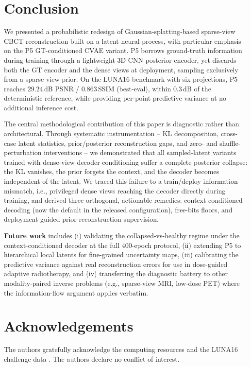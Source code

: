 
\section{Conclusion}
\label{sec:conclusion}

We presented a probabilistic redesign of Gaussian-splatting-based
sparse-view CBCT reconstruction built on a latent neural process, with
particular emphasis on the P5 GT-conditioned CVAE variant. P5 borrows
ground-truth information during training through a lightweight 3D CNN
posterior encoder, yet discards both the GT encoder and the dense views
at deployment, sampling exclusively from a sparse-view prior. On the
LUNA16 benchmark with six projections, P5 reaches $29.24$\,dB PSNR /
$0.863$\,SSIM (best-eval), within $0.3$\,dB of the deterministic
reference, while providing per-point predictive variance at no
additional inference cost.

The central methodological contribution of this paper is diagnostic
rather than architectural. Through systematic instrumentation -- KL
decomposition, cross-case latent statistics, prior/posterior
reconstruction gaps, and zero- and shuffle-perturbation interventions --
we demonstrated that all sampled-latent variants trained with
dense-view decoder conditioning suffer a complete posterior collapse:
the KL vanishes, the prior forgets the context, and the decoder becomes
independent of the latent. We traced this failure to a train/deploy
information mismatch, i.e., privileged dense views reaching the decoder
directly during training, and derived three orthogonal, actionable
remedies: context-conditioned decoding (now the default in the released
configuration), free-bits floors, and deployment-guided
prior-reconstruction supervision.

\textbf{Future work} includes (i) validating the collapsed-vs-healthy
regime under the context-conditioned decoder at the full 400-epoch
protocol, (ii) extending P5 to hierarchical local latents for
fine-grained uncertainty maps, (iii) calibrating the predictive
variance against real reconstruction errors for use in dose-guided
adaptive radiotherapy, and (iv) transferring the diagnostic battery to
other modality-paired inverse problems (e.g., sparse-view MRI,
low-dose PET) where the information-flow argument applies verbatim.

\section*{Acknowledgements}

The authors gratefully acknowledge the computing resources and the
LUNA16 challenge data \cite{setio2017luna16}. The authors declare no
conflict of interest.